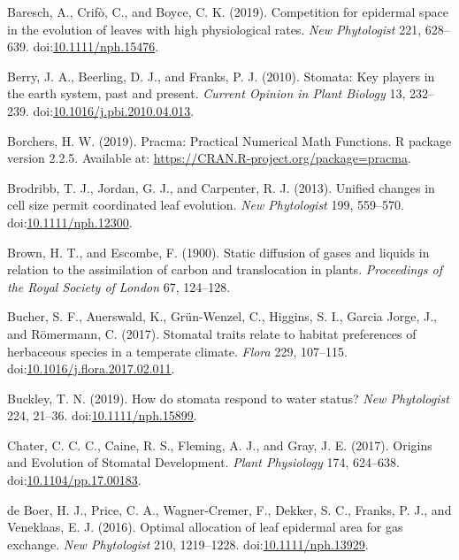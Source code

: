 \documentclass[utf8]{frontiersSCNS}
\begin{document}
\leavevmode\hypertarget{ref-baresch_competition_2019}{}%
Baresch, A., Crifò, C., and Boyce, C. K. (2019). Competition for
epidermal space in the evolution of leaves with high physiological
rates. \emph{New Phytologist} 221, 628--639.
doi:\href{https://doi.org/10.1111/nph.15476}{10.1111/nph.15476}.

\leavevmode\hypertarget{ref-berry_stomata:_2010}{}%
Berry, J. A., Beerling, D. J., and Franks, P. J. (2010). Stomata: Key
players in the earth system, past and present. \emph{Current Opinion in
Plant Biology} 13, 232--239.
doi:\href{https://doi.org/10.1016/j.pbi.2010.04.013}{10.1016/j.pbi.2010.04.013}.

\leavevmode\hypertarget{ref-borchers_pracma:_2019}{}%
Borchers, H. W. (2019). Pracma: Practical Numerical Math Functions. R
package version 2.2.5. Available at:
\url{https://CRAN.R-project.org/package=pracma}.

\leavevmode\hypertarget{ref-brodribb_unified_2013}{}%
Brodribb, T. J., Jordan, G. J., and Carpenter, R. J. (2013). Unified
changes in cell size permit coordinated leaf evolution. \emph{New
Phytologist} 199, 559--570.
doi:\href{https://doi.org/10.1111/nph.12300}{10.1111/nph.12300}.

\leavevmode\hypertarget{ref-brown_static_1900}{}%
Brown, H. T., and Escombe, F. (1900). Static diffusion of gases and
liquids in relation to the assimilation of carbon and translocation in
plants. \emph{Proceedings of the Royal Society of London} 67, 124--128.

\leavevmode\hypertarget{ref-bucher_stomatal_2017}{}%
Bucher, S. F., Auerswald, K., Grün-Wenzel, C., Higgins, S. I., Garcia
Jorge, J., and Römermann, C. (2017). Stomatal traits relate to habitat
preferences of herbaceous species in a temperate climate. \emph{Flora}
229, 107--115.
doi:\href{https://doi.org/10.1016/j.flora.2017.02.011}{10.1016/j.flora.2017.02.011}.

\leavevmode\hypertarget{ref-buckley_how_2019}{}%
Buckley, T. N. (2019). How do stomata respond to water status? \emph{New
Phytologist} 224, 21--36.
doi:\href{https://doi.org/10.1111/nph.15899}{10.1111/nph.15899}.

\leavevmode\hypertarget{ref-chater_origins_2017}{}%
Chater, C. C. C., Caine, R. S., Fleming, A. J., and Gray, J. E. (2017).
Origins and Evolution of Stomatal Development. \emph{Plant Physiology}
174, 624--638.
doi:\href{https://doi.org/10.1104/pp.17.00183}{10.1104/pp.17.00183}.

\leavevmode\hypertarget{ref-de_boer_optimal_2016}{}%
de Boer, H. J., Price, C. A., Wagner-Cremer, F., Dekker, S. C., Franks,
P. J., and Veneklaas, E. J. (2016). Optimal allocation of leaf epidermal
area for gas exchange. \emph{New Phytologist} 210, 1219--1228.
doi:\href{https://doi.org/10.1111/nph.13929}{10.1111/nph.13929}.
\end{document}
